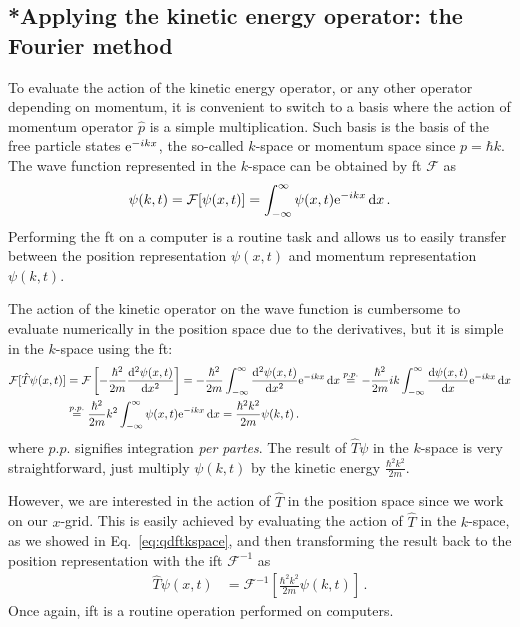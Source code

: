 \subsection{*Applying the kinetic energy operator: the Fourier method}


To evaluate the action of the kinetic energy operator, or any other operator depending on momentum, it is convenient to switch to a basis where the action of momentum operator $\hat{p}$ is a simple multiplication. Such basis is the basis of the free particle states $\mathrm{e}^{-ikx}$, the so-called $k$-space or momentum space since $p = \hbar k$. The wave function represented in the $k$-space can be obtained by \acrfull{ft} $\mathcal{F}$ as
\begin{align}
    \psi(k,t) = \mathcal{F}[\psi(x,t)] =\int_{-\infty}^\infty \psi(x,t) \mathrm{e}^{-ikx}\mathop{}\!\mathrm{d} x \, .
\end{align}
Performing the \acrshort{ft} on a computer is a routine task and allows us to easily transfer between the position representation $\psi(x,t)$ and momentum representation $\psi(k,t)$.

The action of the kinetic operator on the wave function is cumbersome to evaluate numerically in the position space due to the derivatives, but it is simple in the $k$-space using the \acrshort{ft}:
\begin{align}
    \mathcal{F}[\hat{T}\psi(x,t)] &= \mathcal{F}\left[-\frac{\hbar^2}{2m}\frac{\dd^2 \psi(x,t)}{\dd x^2}\right] = -\frac{\hbar^2}{2m} \int_{-\infty}^\infty \frac{\dd^2 \psi(x,t)}{\dd x^2}  \e^{-ikx}\dd x \stackrel{p.p.}{=} -\frac{\hbar^2}{2m} i k \int_{-\infty}^\infty \frac{\dd \psi(x,t)}{\dd x} \e^{-ikx}\dd x \notag \\
    &\stackrel{p.p.}{=} \frac{\hbar^2}{2m} k^2 \int_{-\infty}^\infty \psi(x,t) \e^{-ikx}\dd x = \frac{\hbar^2 k^2}{2m} \psi(k,t) \, .
    \label{eq:qdftkspace}
\end{align}
where $p.p.$ signifies integration \textit{per partes}. The result of $\hat{T}\psi$ in the $k$-space is very straightforward, just multiply $\psi(k,t)$ by the kinetic energy $\frac{\hbar^2 k^2}{2m}$.

However, we are interested in the action of $\hat{T}$ in the position space since we work on our $x$-grid. This is easily achieved by evaluating the action of $\hat{T}$ in the $k$-space, as we showed in Eq.~\eqref{eq:qdftkspace}, and then transforming the result back to the position representation with the \acrfull{ift} $\mathcal{F}^{-1}$ as
\begin{align}
    \hat{T}\psi(x,t) &= \mathcal{F}^{-1}\left[\frac{\hbar^2 k^2}{2m} \psi(k,t)\right] \, .
\end{align}
Once again, \acrshort{ift} is a routine operation performed on computers.

